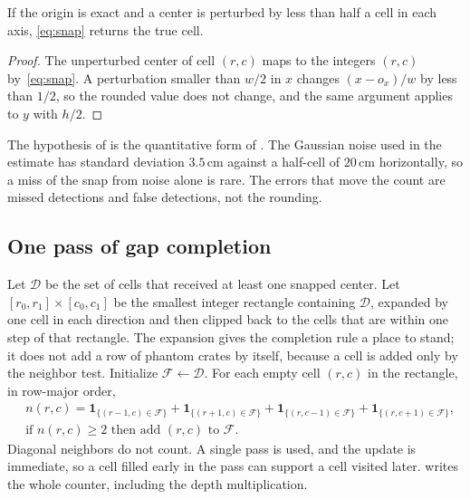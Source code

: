 \begin{proposition}
\label{prop:snap}
If the origin is exact and a center is perturbed by less than half a cell in each axis, \eqref{eq:snap} returns the true cell.
\end{proposition}

\begin{proof}
The unperturbed center of cell $(r,c)$ maps to the integers $(r,c)$ by~\eqref{eq:snap}. A perturbation smaller than $w/2$ in $x$ changes $(x-o_x)/w$ by less than $1/2$, so the rounded value does not change, and the same argument applies to $y$ with $h/2$.
\end{proof}

The hypothesis of  is the quantitative form of . The Gaussian noise used in the estimate has standard deviation $3.5\,\mathrm{cm}$ against a half-cell of $20\,\mathrm{cm}$ horizontally, so a miss of the snap from noise alone is rare. The errors that move the count are missed detections and false detections, not the rounding.

\subsection{One pass of gap completion}
\label{sec:plc-gap}

Let $\mathcal{D}$ be the set of cells that received at least one snapped center. Let $[r_0,r_1]\times[c_0,c_1]$ be the smallest integer rectangle containing $\mathcal{D}$, expanded by one cell in each direction and then clipped back to the cells that are within one step of that rectangle. The expansion gives the completion rule a place to stand; it does not add a row of phantom crates by itself, because a cell is added only by the neighbor test. Initialize $\mathcal{F}\gets\mathcal{D}$. For each empty cell $(r,c)$ in the rectangle, in row-major order,
\begin{equation}
\begin{aligned}
&n(r,c) = \mathbf{1}_{\{(r-1,c)\in\mathcal{F}\}}
+\mathbf{1}_{\{(r+1,c)\in\mathcal{F}\}}
+\mathbf{1}_{\{(r,c-1)\in\mathcal{F}\}}
+\mathbf{1}_{\{(r,c+1)\in\mathcal{F}\}},\\
&\text{if } n(r,c)\ge 2 \text{ then add } (r,c) \text{ to } \mathcal{F}.
\end{aligned}
\label{eq:gap}
\end{equation}
Diagonal neighbors do not count. A single pass is used, and the update is immediate, so a cell filled early in the pass can support a cell visited later.  writes the whole counter, including the depth multiplication.

